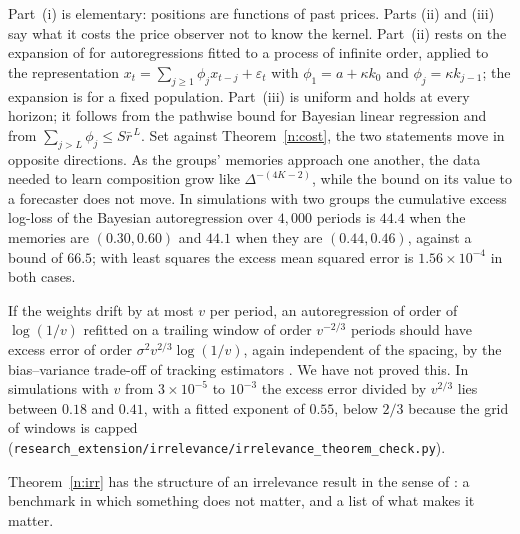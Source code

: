 Part~(i) is elementary: positions are functions of past prices. Parts (ii) and (iii) say what it costs the price observer not to know the kernel. Part~(ii) rests on the expansion of \citet{ingwei2003} for autoregressions fitted to a process of infinite order, applied to the representation $x_t=\sum_{j\ge1}\phi_jx_{t-j}+\varepsilon_t$ with $\phi_1=a+\kappa k_0$ and $\phi_j=\kappa k_{j-1}$; the expansion is for a fixed population. Part~(iii) is uniform and holds at every horizon; it follows from the pathwise bound for Bayesian linear regression \citep{vovk2001} and from $\sum_{j>L}\phi_j\le S\bar r^{\,L}$. Set against Theorem~\ref{n:cost}, the two statements move in opposite directions. As the groups' memories approach one another, the data needed to learn composition grow like $\Delta^{-(4K-2)}$, while the bound on its value to a forecaster does not move. In simulations with two groups the cumulative excess log-loss of the Bayesian autoregression over $4{,}000$ periods is $44.4$ when the memories are $(0.30,0.60)$ and $44.1$ when they are $(0.44,0.46)$, against a bound of $66.5$; with least squares the excess mean squared error is $1.56\times10^{-4}$ in both cases.

\begin{remark}
If the weights drift by at most $v$ per period, an autoregression of order of $\log(1/v)$ refitted on a trailing window of order $v^{-2/3}$ periods should have excess error of order $\sigma^2v^{2/3}\log(1/v)$, again independent of the spacing, by the bias--variance trade-off of tracking estimators \citep{guoljung1995}. We have not proved this. In simulations with $v$ from $3\times10^{-5}$ to $10^{-3}$ the excess error divided by $v^{2/3}$ lies between $0.18$ and $0.41$, with a fitted exponent of $0.55$, below $2/3$ because the grid of windows is capped (\nolinkurl{research_extension/irrelevance/irrelevance_theorem_check.py}).
\end{remark}

Theorem~\ref{n:irr} has the structure of an irrelevance result in the sense of \citet{mm1958}: a benchmark in which something does not matter, and a list of what makes it matter.

